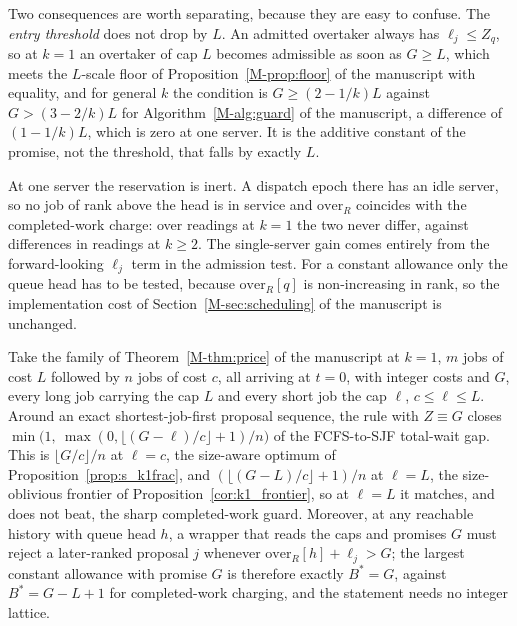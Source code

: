 Two consequences are worth separating, because they are easy to confuse. The
\emph{entry threshold} does not drop by $L$. An admitted overtaker always has
$\ell_j \le Z_q$, so at $k=1$ an overtaker of cap $L$ becomes admissible as soon as
$G \ge L$, which meets the $L$-scale floor of Proposition~\ref*{M-prop:floor} of the manuscript with
equality, and for general $k$ the condition is $G \ge (2-1/k)L$ against
$G > (3-2/k)L$ for Algorithm~\ref*{M-alg:guard} of the manuscript, a difference of $(1-1/k)L$, which is
zero at one server. It is the additive constant of the promise, not the threshold, that
falls by exactly $L$.

At one server the reservation is inert. A dispatch epoch there has an idle server, so no
job of rank above the head is in service and $\mathrm{over}_R$ coincides with the
completed-work charge: over  readings at $k=1$ the two never differ,
against  differences in  readings at $k \ge 2$. The
single-server gain comes entirely from the forward-looking $\ell_j$ term in the admission
test. For a constant allowance only the queue head has to be tested, because
$\mathrm{over}_R[q]$ is non-increasing in rank, so the implementation cost of
Section~\ref*{M-sec:scheduling} of the manuscript is unchanged.

\begin{proposition}
\label{prop:supp_reservation_k1}
Take the family of Theorem~\ref*{M-thm:price} of the manuscript at $k=1$, $m$ jobs of cost
$L$ followed by $n$ jobs of cost $c$, all arriving at $t=0$, with integer costs and $G$,
every long job carrying the cap $L$ and every short job the cap $\ell$, $c\leq\ell\leq L$.
Around an exact shortest-job-first proposal sequence, the rule with $Z\equiv G$ closes
$\min\bigl(1,\ \max(0,\lfloor (G-\ell)/c \rfloor+1)/n\bigr)$ of the FCFS-to-SJF
total-wait gap. This is $\lfloor G/c \rfloor/n$ at $\ell = c$, the size-aware
optimum of Proposition~\ref{prop:s_k1frac}, and $(\lfloor (G-L)/c \rfloor+1)/n$ at
$\ell = L$, the size-oblivious frontier of Proposition~\ref{cor:k1_frontier}, so at $\ell=L$ it matches, and does not beat, the sharp completed-work guard.
Moreover, at any reachable history with queue head $h$, a wrapper that reads the caps and
promises $G$ must reject a later-ranked proposal $j$ whenever
$\mathrm{over}_R[h]+\ell_j > G$; the largest constant allowance with promise $G$ is
therefore exactly $B^{*}=G$, against $B^{*}=G-L+1$ for completed-work charging, and the
statement needs no integer lattice.
\end{proposition}

